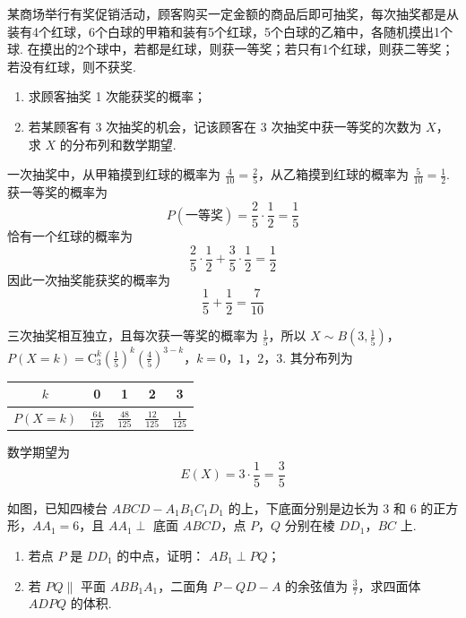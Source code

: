 \begin{problem}
某商场举行有奖促销活动，顾客购买一定金额的商品后即可抽奖，每次抽奖都是从装有4个红球，6个白球的甲箱和装有5个红球，5个白球的乙箱中，各随机摸出1个球. 在摸出的2个球中，若都是红球，则获一等奖；若只有1个红球，则获二等奖；若没有红球，则不获奖.

\begin{enumerate}
\item 求顾客抽奖 1 次能获奖的概率；
\item 若某顾客有 3 次抽奖的机会，记该顾客在 3 次抽奖中获一等奖的次数为 \(X\)，求 \(X\) 的分布列和数学期望.
\end{enumerate}
\end{problem}

\begin{solution}
一次抽奖中，从甲箱摸到红球的概率为 \(\frac{4}{10}=\frac{2}{5}\)，从乙箱摸到红球的概率为 \(\frac{5}{10}=\frac{1}{2}\). 获一等奖的概率为
\[
P(\text{一等奖})=\frac25\cdot\frac12=\frac15
\]
恰有一个红球的概率为
\[
\frac25\cdot\frac12+\frac35\cdot\frac12=\frac12
\]
因此一次抽奖能获奖的概率为
\[
\frac15+\frac12=\frac7{10}
\]

三次抽奖相互独立，且每次获一等奖的概率为 \(\frac{1}{5}\)，所以
\(X\sim B\left(3,\frac15\right)\)，\(P(X=k)=\mathrm C_3^k\left(\frac15\right)^k\left(\frac45\right)^{3-k}\)，\(k=0\)，\(1\)，\(2\)，\(3\).
其分布列为
\begin{center}
\begin{tabular}{c|cccc}
\(k\) & 0 & 1 & 2 & 3 \\
\hline
\(P(X=k)\) & \(\frac{64}{125}\) & \(\frac{48}{125}\) & \(\frac{12}{125}\) & \(\frac{1}{125}\)
\end{tabular}
\end{center}
数学期望为
\[
E(X)=3\cdot\frac15=\frac35
\]
\end{solution}

\begin{problem}
如图，已知四棱台 \(ABCD - A_{1}B_{1}C_{1}D_{1}\) 的上，下底面分别是边长为 3 和 6 的正方形，\(AA_{1} = 6\)，且 \(AA_{1} \perp\) 底面 \(ABCD\)，点 \(P\)，\(Q\) 分别在棱 \(DD_{1}\)，\(BC\) 上.

\begin{enumerate}
\item 若点 \(P\) 是 \(DD_{1}\) 的中点，证明： \(AB_{1} \perp PQ\)；
\item 若 \(PQ \parallel\) 平面 \(ABB_{1}A_{1}\)，二面角 \(P - QD - A\) 的余弦值为 \(\frac{3}{7}\)，求四面体 \(ADPQ\) 的体积.
\end{enumerate}

\end{problem}

